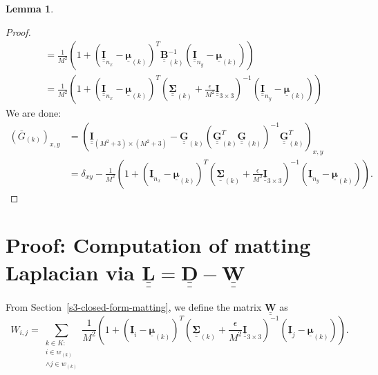 \documentclass{article}
\theoremstyle{definition}
\newtheorem{lemma}[theorem]{Lemma}
\def\vt#1{\underline{\mathbf{#1}}}
\def\vts#1{\underline{\boldsymbol{#1}}}
\def\mt#1{\underline{\underline{\mathbf{#1}}}}
\def\mts#1{\underline{\underline{\boldsymbol{#1}}}}
\begin{document}
\begin{lemma}
\begin{proof}
\begin{align*}
            &= \frac1{M^2} \left(1 + \left(\mt I_{n_x} - \vts \mu_{(k)}\right)^T \mt B_{(k)}^{-1} \left(\mt I_{n_y} - \vts \mu_{(k)}\right)\right)\\
            &= \frac1{M^2} \left(1 + \left(\mt I_{n_x} - \vts \mu_{(k)}\right)^T \left(\mts \Sigma_{(k)}+\frac\epsilon{M^2}\mt I_{3\times 3}\right)^{-1} \left(\mt I_{n_y} - \vts \mu_{(k)}\right)\right)
        \end{align*}
        We are done:
        \begin{align*}
            \left({\bar{G}}_{(k)}\right)_{x,y} &= \left(\mt I_{(M^2+3)\times(M^2+3)} - \mt G_{(k)} \left(\mt G_{(k)}^T \mt G_{(k)}\right)^{-1} \mt G_{(k)}^T\right)_{x,y} \\
            &= \delta_{xy} - \frac1{M^2}\left(1 + \left(\vt{I}_{n_x} - \vts \mu_{(k)}\right)^T \left(\mts \Sigma_{(k)} + \frac\epsilon{M^2} \mt{I}_{3\times 3}\right)^{-1} \left(\vt{I}_{n_y} - \vts \mu_{(k)}\right) \right).
        \end{align*}
    \end{proof}
\end{lemma}



\newpage
\section{Proof: Computation of matting Laplacian via $\mt L = \mt D - \mt W$} \label{appendix:w-sum-zero-proof}
From Section~\ref{s3-closed-form-matting}, we define the matrix $\mt W$ as
$$ W_{i,j} = \sum_{\substack{k\in K:\\i\in w_{(k)}\\\wedge j\in w_{(k)}}} \frac1{M^2}\left(1 + \left(\vt{I}_i - \vts \mu_{(k)}\right)^T \left(\mts \Sigma_{(k)} + \frac\epsilon{M^2} \mt{I}_{3\times 3}\right)^{-1} \left(\vt{I}_j - \vts \mu_{(k)}\right) \right). $$
\end{document}
